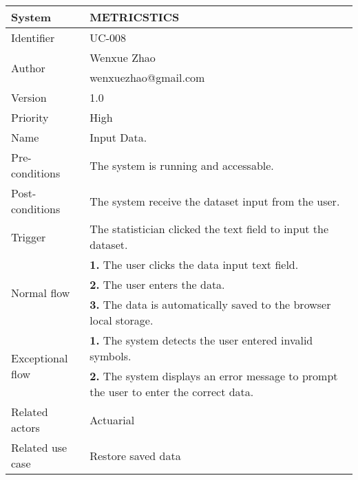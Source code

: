 \begin{table}[htb]
    \centering
    \begin{tabular}{|p{4cm}|p{12cm}|} \hline 
         System &  METRICSTICS\\ \hline 
         
         Identifier & UC-008 \\ \hline 
         
         \multirow{2}{*}{Author} & Wenxue Zhao   \\
         &wenxuezhao@gmail.com \\
           \hline 
           Version & 1.0\\ \hline
         
         Priority &  High\\ \hline 
         
         Name & Input Data. \\ \hline 
         Pre-conditions & The system is running and accessable. \\ \hline 
         Post-conditions & The system receive the dataset input from the user.  \\ \hline
         Trigger & The statistician clicked the text field to input the dataset. \\ \hline
        \multirow{3}{*}{Normal flow} 
        & \textbf{1.} The user clicks the data input text field. \\ 
        & \textbf{2.} The user enters the data.   \\ 
 & \textbf{3.}  The data is automatically saved to the browser local storage. \\ 
         
        
        \hline
        \multirow{2}{*}{Exceptional flow} 
        & \textbf{1.} The system detects the user entered invalid symbols. \\ 
        & \textbf{2.} The system displays an error message to prompt the user to enter the correct data.   \\  \hline 
        Related actors & Actuarial \\ \hline
        Related use case & Restore saved data  \\ \hline
    \end{tabular}
    \end{table}
